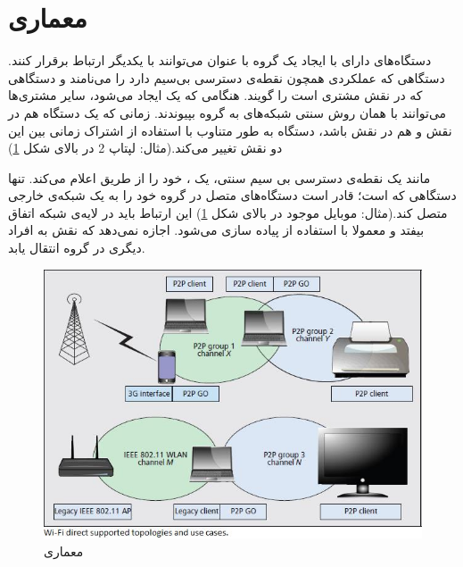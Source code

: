 \section{معماری}
دستگاه‌های دارای 
با ایجاد یک گروه با عنوان 
می‌توانند با یکدیگر ارتباط برقرار کنند. دستگاهی که عملکردی همچون نقطه‌ی دسترسی بی‌سیم دارد را 
می‌نامند و دستگاهی که در نقش مشتری است را 
گویند.
هنگامی که یک 
ایجاد می‌شود، سایر مشتری‌ها می‌توانند با همان روش سنتی شبکه‌های 
به گروه بپیوندند. زمانی که یک دستگاه هم در نقش 
 و هم در نقش 
باشد، دستگاه به طور متناوب با استفاده از اشتراک زمانی 
بین این دو نقش تغییر می‌کند.(مثال: لپتاپ 2 در بالای شکل \ref{fig:WifiDirectArchitecture})

 مانند یک نقطه‌ی دسترسی بی سیم سنتی، یک
، خود را از طریق 
  اعلام می‌کند. تنها دستگاهی که 
 است؛ قادر است دستگاه‌های متصل در گروه خود را به یک شبکه‌ی خارجی متصل کند.(مثال: موبایل موجود در بالا‌ی شکل \ref{fig:WifiDirectArchitecture}) این ارتباط باید در لایه‌ی شبکه 
اتفاق بیفتد و معمولا با استفاده از 
پیاده سازی می‌شود.
اجازه نمی‌دهد که نقش 
به افراد دیگری در گروه انتقال یابد.

\begin{figure}
	\centerline{
	\includegraphics{images/wifidirectarchitecture.jpg}}
	\caption{معماری }
	\label{fig:WifiDirectArchitecture}
\end{figure}

